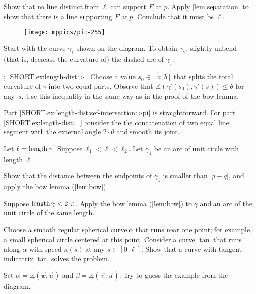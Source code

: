 \begin{multicols}{2}
Show that no line distinct from $\ell$ can support $F$ at $p$. 
Apply \ref{lem:separation} to show that there is a line supporting $F$ at $p$.
Conclude that it must be $\ell$.

{

\begin{wrapfigure}{r}{22 mm}
\vskip-6mm
\centering
\texttt{[image: mppics/pic-255]}
\vskip0mm
\end{wrapfigure}

Start with the curve $\gamma_1$ shown on the diagram.
To obtain $\gamma_2$, slightly unbend (that is, decrease the curvature of) the dashed arc of $\gamma_1$.


\parbf{\ref{ex:length-dist}}; \ref{SHORT.ex:length-dist:>}.
Choose a value $s_0\in[a,b]$ that splits the total curvature of $\gamma$ into two equal parts.
Observe that $\measuredangle(\gamma'(s_0),\gamma'(s))\le \theta$ for any~$s$.
Use this inequality in the same way as in the proof of the bow lemma.

Part \ref{SHORT.ex:length-dist:sef-intersection:>pi} is straightforward.
For part \ref{SHORT.ex:length-dist:=} consider the the concatenation of two equal line segment with the external angle $2\cdot\theta$ and smooth its joint. 


}

Let $\ell=\mathop{\rm length}\nolimits\gamma$.
Suppose $\ell_1<\ell<\ell_2$.
Let $\gamma_1$ be an arc of unit circle with length $\ell$.

Show that the distance between the endpoints of $\gamma_1$ is smaller than $|p-q|$, and apply the bow lemma (\ref{lem:bow}).


Suppose $\length\gamma<2\cdot\pi$. 
Apply the bow lemma (\ref{lem:bow}) to $\gamma$ and an arc of the unit circle of the same length.

Choose a smooth regular spherical curve $\alpha$ that runs near one point;
for example, a small spherical circle centered at this point.
Consider a curve $\tan$ that runs along $\alpha$ with speed $\kappa(s)$ at any $s\in [0,\ell]$.
Show that a curve with tangent indicatrix $\tan$ solves the problem.


Set $\alpha=\measuredangle(\vec w,\vec u)$ 
and $\beta=\measuredangle(\vec v,\vec u)$.
Try to guess the example from the diagram.


\end{multicols}
